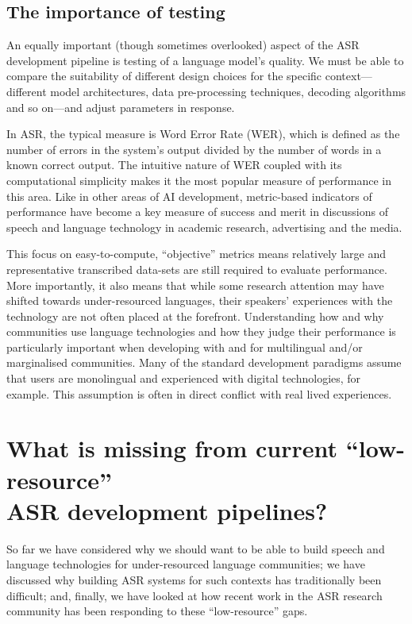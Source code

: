 \documentclass[10pt,twoside,openright]{report}
\begin{document}
\vspace{-1em}
\begin{unmutehighlight}
\section*{The importance of testing}
An equally important (though sometimes overlooked) aspect of the ASR development pipeline is testing of a language model's quality.
We must be able to compare the suitability of different design choices for the specific context---different model architectures, data pre-processing techniques, decoding algorithms and so on---and adjust parameters in response.

\vspace{1em}

In ASR, the typical measure is Word Error Rate (WER), which is defined as the number of errors in the system's output divided by the number of words in a known correct output.
The intuitive nature of WER coupled with its computational simplicity makes it the most popular measure of performance in this area.
Like in other areas of AI development, metric-based indicators of performance have become a key measure of success and merit in discussions of speech and language technology in academic research, advertising and the media.

\vspace{1em}

This focus on easy-to-compute, ``objective'' metrics %
means relatively large and representative transcribed data-sets are still required to evaluate performance.
More importantly, it also means that while some research attention may have shifted towards under-resourced languages, their speakers' experiences with the technology are not often placed at the forefront.
Understanding how and why communities use language technologies and how they judge their performance is particularly important when developing with and for multilingual and/or marginalised communities.
Many of the standard development paradigms assume that users are monolingual and experienced with digital technologies, for example.
This assumption is often in direct conflict with real lived experiences.
\end{unmutehighlight}


\section{What is missing from current ``low-resource''\texorpdfstring{\\}{ }ASR development pipelines?}
So far we have considered why we should want to be able to build speech and language technologies for under-resourced language communities; we have discussed why building ASR systems for such contexts has traditionally been difficult; and, finally, we have looked at how recent work in the ASR research community has been responding to these ``low-resource'' gaps. 
\end{document}
